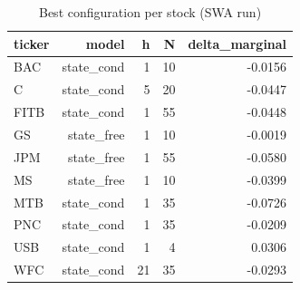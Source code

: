 \begin{table}[ht]
\centering
\caption{Best configuration per stock (SWA run)}
\label{tab:best-config}
\begin{tabular}{lrrrr}
\toprule
ticker & model & h & N & delta_marginal \\
\midrule
BAC & state_cond & 1 & 10 & -0.0156 \\
C & state_cond & 5 & 20 & -0.0447 \\
FITB & state_cond & 1 & 55 & -0.0448 \\
GS & state_free & 1 & 10 & -0.0019 \\
JPM & state_free & 1 & 55 & -0.0580 \\
MS & state_free & 1 & 10 & -0.0399 \\
MTB & state_cond & 1 & 35 & -0.0726 \\
PNC & state_cond & 1 & 35 & -0.0209 \\
USB & state_cond & 1 & 4 & 0.0306 \\
WFC & state_cond & 21 & 35 & -0.0293 \\
\bottomrule
\end{tabular}
\end{table}